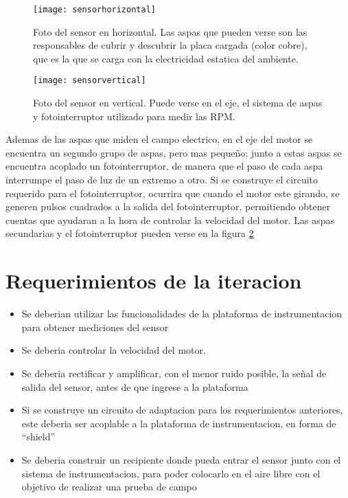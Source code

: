 \begin{figure}[h]
  \centering
  \texttt{[image: sensorhorizontal]}
  \caption[Imagen del sensor de campo electrostatico utilizado (horizontal)]{Foto del sensor en horizontal. Las aspas que pueden verse son las responsables de cubrir y descubrir la placa cargada (color cobre), que es la que se carga con la electricidad estatica del ambiente.}\label{fig:sensorhorizontal}
\end{figure}

\begin{figure}[h]
  \centering
  \texttt{[image: sensorvertical]}
  \caption[Imagen del sensor de campo electrostatico utilizado (vertical)]{Foto del sensor en vertical. Puede verse en el eje, el sistema de aspas y fotointerruptor utilizado para medir las RPM.}\label{fig:sensorvertical}
\end{figure}

Ademas de las aspas que miden el campo electrico, en el eje del motor se encuentra un segundo grupo de aspas, pero mas pequeño; junto a estas aspas se encuentra acoplado un fotointerruptor, de manera que el paso de cada aspa interrumpe el paso de luz de un extremo a otro. Si se construye el circuito requerido para el fotointerruptor, ocurrira que cuando el motor este girando, se generen pulsos cuadrados a la salida del fotointerruptor, permitiendo obtener cuentas que ayudaran a la hora de controlar la velocidad del motor. Las aspas secundarias y el fotointerruptor pueden verse en la figura \ref{fig:sensorvertical}



\section{Requerimientos de la iteracion} %
\label{it6:sec:requerimientos_de_la_iteracion}

\begin{itemize}
\item Se deberian utilizar las funcionalidades de la plataforma de instrumentacion para obtener mediciones del sensor
\item Se deberia controlar la velocidad del motor.
\item Se deberia rectificar y amplificar, con el menor ruido posible, la señal de salida del sensor, antes de que ingrese a la plataforma
\item Si se construye un circuito de adaptacion para los requerimientos anteriores, este deberia ser acoplable a la plataforma de instrumentacion, en forma de ``shield''
\item Se deberia construir un recipiente donde pueda entrar el sensor junto con el sistema de instrumentacion, para poder colocarlo en el aire libre con el objetivo de realizar una prueba de campo
\end{itemize}



